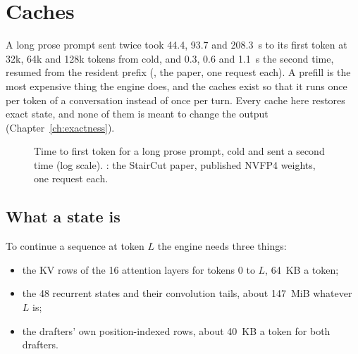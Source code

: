 \chapter{Caches}\label{ch:caches}

A long prose prompt sent twice took 44.4, 93.7 and 208.3~s to its first token at 32k, 64k and 128k tokens from cold, and 0.3, 0.6 and 1.1~s the second time, resumed from the resident prefix (\measured, the paper, one request each). A prefill is the most expensive thing the engine does, and the caches exist so that it runs once per token of a conversation instead of once per turn. Every cache here restores exact state, and none of them is meant to change the output (Chapter~\ref{ch:exactness}).

\begin{figure}[htbp]
\centering
{}
\caption[Time to first token, cold and resumed]{Time to first token for a long prose prompt, cold and sent a second time (log scale). \measured: the StairCut paper, published NVFP4 weights, one request each.}\label{fig:ttft}
\end{figure}

\section{What a state is}

To continue a sequence at token $L$ the engine needs three things:

\begin{itemize}
\item the KV rows of the 16 attention layers for tokens 0 to $L$, 64~KB a token;
\item the 48 recurrent states and their convolution tails, about 147~MiB whatever $L$ is;
\item the drafters' own position-indexed rows, about 40~KB a token for both drafters.
\end{itemize}

